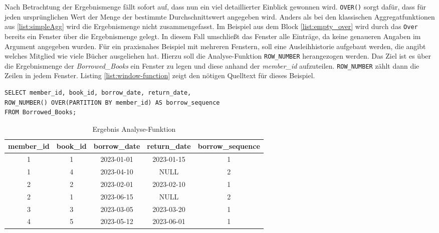 Nach Betrachtung der Ergebnismenge fällt sofort auf, dass nun ein viel
detaillierter Einblick gewonnen wird. \texttt{OVER()} sorgt dafür, dass für jeden
ursprünglichen Wert der Menge der bestimmte Durchschnittswert angegeben wird.
Anders als bei den klassischen Aggregatfunktionen aus \ref{list:simpleAgg} wird
die Ergebnismenge nicht zusammengefasst. Im Beispiel aus dem Block \ref{list:empty_over}
wird durch das \texttt{Over} bereits ein Fenster über die Ergebnismenge gelegt. In
diesem Fall umschließt das Fenster alle Einträge, da keine genaueren Angaben im
Argument angegeben wurden. Für ein praxisnahes Beispiel mit mehreren Fenstern,
soll eine Ausleihhistorie aufgebaut werden, die angibt welches Mitglied wie viele
Bücher ausgeliehen hat. Hierzu soll die Analyse-Funktion \texttt{ROW\_NUMBER} herangezogen
werden. Das Ziel ist es über die Ergebnismenge der \textit{Borrowed\_Books} ein Fenster
zu legen und diese anhand der \textit{member\_id} aufzuteilen. \texttt{ROW\_NUMBER}
zählt dann die Zeilen in jedem Fenster. Listing \ref{list:window-function} zeigt
den nötigen Quelltext für dieses Beispiel.

\begin{lstlisting}
SELECT member_id, book_id, borrow_date, return_date,
ROW_NUMBER() OVER(PARTITION BY member_id) AS borrow_sequence
FROM Borrowed_Books;
\end{lstlisting}
\begin{table}[h]
	\centering
	\begin{tabular}{|c|c|c|c|c|}
		\hline
		\textbf{member\_id} & \textbf{book\_id} & \textbf{borrow\_date} & \textbf{return\_date} & \textbf{borrow\_sequence} \\
		\hline
		1                   & 1                 & 2023-01-01            & 2023-01-15            & 1                         \\
		\hline
		1                   & 4                 & 2023-04-10            & NULL                  & 2                         \\
		\hline
		2                   & 2                 & 2023-02-01            & 2023-02-10            & 1                         \\
		\hline
		2                   & 1                 & 2023-06-15            & NULL                  & 2                         \\
		\hline
		3                   & 3                 & 2023-03-05            & 2023-03-20            & 1                         \\
		\hline
		4                   & 5                 & 2023-05-12            & 2023-06-01            & 1                         \\
		\hline
	\end{tabular}
	\caption{Ergebnis Analyse-Funktion}
	\label{tab:ergebnnis_analyse_funktion}
\end{table}

